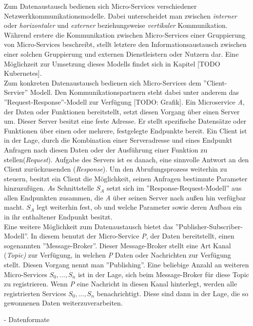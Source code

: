 Zum Datenaustausch bedienen sich Micro-Services verschiedener Netzwerkkommunikationsmodelle. Dabei unterscheidet man zwischen \textit{interner} oder \textit{horizontaler} und \textit{externer} beziehungsweise \textit{vertikaler} Kommunikation. Während erstere die Kommunikation zwischen Micro-Services einer Gruppierung von Micro-Services beschreibt, stellt letztere den Informationsaustausch zwischen einer solchen Gruppierung und externen Dienstleistern oder Nutzern dar. Eine Möglichzeit zur Umsetzung dieses Modells findet sich in Kapitel [TODO Kubernetes]. \\
Zum konkreten Datenaustausch bedienen sich Micro-Services dem ''Client-Servier'' Modell. Den Kommunikationspartnern steht dabei unter anderem das ''Request-Response''-Modell zur Verfügung [TODO: Grafik]. Ein Microservice \textit{A}, der Daten oder Funktionen bereitstellt, setzt diesen Vorgang über einen Server um. Dieser Server besitzt eine feste Adresse. Er stellt spezifische Datensätze oder Funktionen über einen oder mehrere, festgelegte Endpunkte bereit. Ein Client ist in der Lage, durch die Kombination einer Serveradresse und eines Endpunkt Anfragen nach diesen Daten oder der Ausführung einer Funktion zu stellen(\textit{Request}). Aufgabe des Servers ist es danach, eine sinnvolle Antwort an den Client zurückzusenden (\textit{Response}). Um den Abrufungsprozess weiterhin zu steuern, besitzt ein Client die Möglichkeit, seinen Anfragen bestimmte Parameter hinzuzufügen.
\textit{A}s Schnittstelle $S_A$ setzt sich im ''Response-Request-Modell'' aus allen Endpunkten zusammen, die \textit{A} über seinen Server nach außen hin verfügbar macht. $S_A$ legt weiterhin fest, ob und welche Parameter sowie deren Aufbau ein in ihr enthaltener Endpunkt besitzt. \\
Eine weitere Möglichkeit zum Datenaustausch bietet das ''Publisher-Subscriber-Modell''. In diesem benutzt der Micro-Service \textit{P}, der Daten bereitstellt, einen sogenannten ''Message-Broker''. Dieser Message-Broker stellt eine Art Kanal (\textit{Topic)} zur Verfügung, in welchen \textit{P} Daten oder Nachrichten zur Verfügung stellt. Diesen Vorgang nennt man ''Publishing''. Eine beliebige Anzahl an weiteren Micro-Services $S_0, ..., S_n$ ist in der Lage, sich beim Message-Broker für diese Topic zu registrieren. Wenn \textit{P} eine Nachricht in diesen Kanal hinterlegt, werden alle registrierten Services $S_0,...,S_n$ benachrichtigt. Diese sind dann in der Lage, die so gewonnenen Daten weiterzuverarbeiten.  

- Datenformate

